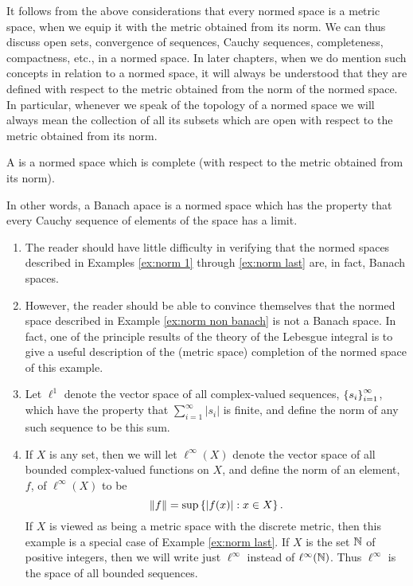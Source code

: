 It follows from the above considerations that every normed space is a metric space, when we equip it with the metric obtained from its norm. We can thus discuss open sets, convergence of sequences, Cauchy sequences, completeness, compactness, etc., in a normed space. In later chapters, when we do mention such concepts in relation to a normed space, it will always be understood that they are defined with respect to the metric obtained from the norm of the normed space. In particular, whenever we speak of the topology of a normed space we will always mean the collection of all its subsets which are open with respect to the metric obtained from its norm.

\begin{definition}
A  is a normed space which is complete (with respect to the metric obtained from its norm).
\end{definition}

In other words, a Banach apace is a normed space which has the property that every Cauchy sequence of elements of the space has a limit.


\begin{examples}
\begin{enumerate}
    \item\label{ex:banach 1}
    The reader should have little difficulty in verifying that the normed spaces described in Examples \ref{ex:norm 1} through \ref{ex:norm last} are, in fact, Banach spaces.
    
    \item\label{ex:banach non ex}
    However, the reader should be able to convince themselves that the normed space described in Example \ref{ex:norm non banach} is not a Banach space. In fact, one of the principle results of the theory of the Lebesgue integral is to give a useful description of the (metric space) completion of the normed space of this example.
    
    \item\label{ex:banach 2}
    Let $\ell^1$ denote the vector space of all complex-valued sequences, $\left\{s_i\right\}_{i=1}^\infty$, which have the property that $\sum_{i=1}^\infty|s_i|$ is finite, and define the norm of any such sequence to be this sum.
    
    \item\label{ex:banach 3}
    If $X$ is any set, then we will let $\ell^\infty(X)$ denote the vector space of all bounded complex-valued functions on $X$, and define the norm of an element, $f$, of $\ell^\infty(X)$ to be \[\norm{f}=\sup\left\{|f(x)|:x\in X\right\}.\] If $X$ is viewed as being a metric space with the discrete metric, then this example is a special case of Example \ref{ex:norm last}. If $X$ is the set $\mathbb{N}$ of positive integers, then we will write just $\ell^\infty$ instead of $\ell^\infty(\mathbb{N})$. Thus $\ell^\infty$ is the space of all bounded sequences.
\end{enumerate} 
\end{examples}

